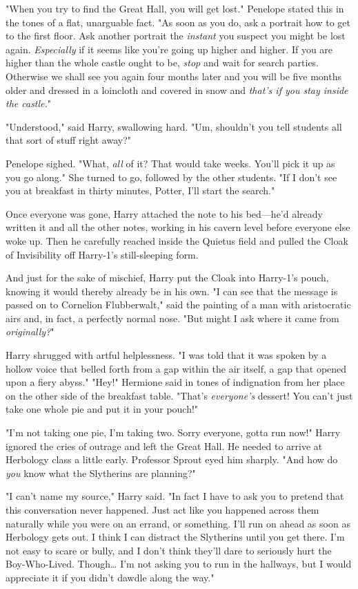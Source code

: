 "When you try to find the Great Hall, you will get lost." Penelope stated this 
in the tones of a flat, unarguable fact. "As soon as you do, ask a portrait how 
to get to the first floor. Ask another portrait the \emph{instant} you suspect 
you might be lost again. \emph{Especially} if it seems like you're going up 
higher and higher. If you are higher than the whole castle ought to be, 
\emph{stop} and wait for search parties. Otherwise we shall see you again four 
months later and you will be five months older and dressed in a loincloth and 
covered in snow and \emph{that's if you stay inside the castle.}"

"Understood," said Harry, swallowing hard. "Um, shouldn't you tell students all 
that sort of stuff right away?"

Penelope sighed. "What, \emph{all} of it? That would take weeks. You'll pick it 
up as you go along." She turned to go, followed by the other students. "If I 
don't see you at breakfast in thirty minutes, Potter, I'll start the search."

Once everyone was gone, Harry attached the note to his bed---he'd already 
written it and all the other notes, working in his cavern level before everyone 
else woke up. Then he carefully reached inside the Quietus field and pulled the 
Cloak of Invisibility off Harry-{1}'s still-sleeping form.

And just for the sake of mischief, Harry put the Cloak into Harry-{1}'s pouch, 
knowing it would thereby already be in his own.
\sbreak
"I can see that the message is passed on to Cornelion Flubberwalt," said the 
painting of a man with aristocratic airs and, in fact, a perfectly normal nose. 
"But might I ask where it came from \emph{originally?}"

Harry shrugged with artful helplessness. "I was told that it was spoken by a 
hollow voice that belled forth from a gap within the air itself, a gap that 
opened upon a fiery abyss."
\sbreak
"Hey!" Hermione said in tones of indignation from her place on the other side 
of the breakfast table. "That's \emph{everyone's} dessert! You can't just take 
one whole pie and put it in your pouch!"

"I'm not taking one pie, I'm taking two. Sorry everyone, gotta run now!" Harry 
ignored the cries of outrage and left the Great Hall. He needed to arrive at 
Herbology class a little early.
\sbreak
Professor Sprout eyed him sharply. "And how do \emph{you} know what the 
Slytherins are planning?"

"I can't name my source," Harry said. "In fact I have to ask you to pretend 
that this conversation never happened. Just act like you happened across them 
naturally while you were on an errand, or something. I'll run on ahead as soon 
as Herbology gets out. I think I can distract the Slytherins until you get 
there. I'm not easy to scare or bully, and I don't think they'll dare to 
seriously hurt the Boy-Who-Lived. Though{\ldots} I'm not asking you to run in 
the hallways, but I would appreciate it if you didn't dawdle along the way."

